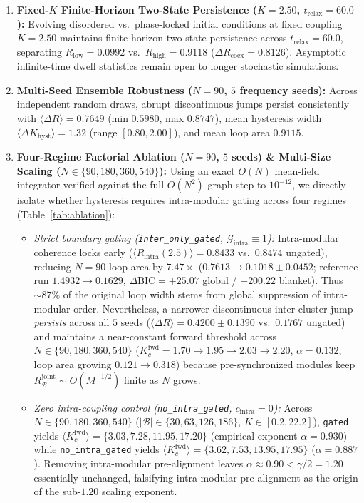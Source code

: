 \documentclass[11pt,a4paper]{article}
\begin{document}
\begin{enumerate}
\item \textbf{Fixed-$K$ Finite-Horizon Two-State Persistence ($K = 2.50$, $t_{\mathrm{relax}} = 60.0$):} Evolving disordered vs.\ phase-locked initial conditions at fixed coupling $K = 2.50$ maintains finite-horizon two-state persistence across $t_{\mathrm{relax}} = 60.0$, separating $R_{\mathrm{low}} = 0.0992$ vs.\ $R_{\mathrm{high}} = 0.9118$ ($\Delta R_{\mathrm{coex}} = 0.8126$). Asymptotic infinite-time dwell statistics remain open to longer stochastic simulations.
\item \textbf{Multi-Seed Ensemble Robustness ($N=90$, $5$ frequency seeds):} Across independent random draws, abrupt discontinuous jumps persist consistently with $\langle\Delta R\rangle = 0.7649$ (min $0.5980$, max $0.8747$), mean hysteresis width $\langle\Delta K_{\mathrm{hyst}}\rangle = 1.32$ (range $[0.80, 2.00]$), and mean loop area $0.9115$.
\item \textbf{Four-Regime Factorial Ablation ($N=90$, $5$ seeds) \& Multi-Size Scaling ($N \in \{90, 180, 360, 540\}$):} Using an exact $O(N)$ mean-field integrator verified against the full $O(N^2)$ graph step to $10^{-12}$, we directly isolate whether hysteresis requires intra-modular gating across four regimes (Table~\ref{tab:ablation}):
  \begin{itemize}
  \item \emph{Strict boundary gating (\texttt{inter\_only\_gated}, $\mathcal{G}_{\mathrm{intra}} \equiv 1$):} Intra-modular coherence locks early ($\langle R_{\mathrm{intra}}(2.5)\rangle = 0.8433$ vs.\ $0.8474$ ungated), reducing $N=90$ loop area by $7.47\times$ ($0.7613 \to 0.1018 \pm 0.0452$; reference run $1.4932 \to 0.1629$, $\Delta\mathrm{BIC} = +25.07$ global / $+200.22$ blanket). Thus $\sim 87\%$ of the original loop width stems from global suppression of intra-modular order. Nevertheless, a narrower discontinuous inter-cluster jump \emph{persists} across all $5$ seeds ($\langle\Delta R\rangle = 0.4200 \pm 0.1390$ vs.\ $0.1767$ ungated) and maintains a near-constant forward threshold across $N \in \{90, 180, 360, 540\}$ ($K_c^{\mathrm{fwd}} = 1.70 \to 1.95 \to 2.03 \to 2.20$, $\alpha = 0.132$, loop area growing $0.121 \to 0.318$) because pre-synchronized modules keep $R_{\mathcal{B}}^{\mathrm{joint}} \sim O(M^{-1/2})$ finite as $N$ grows.
  \item \emph{Zero intra-coupling control (\texttt{no\_intra\_gated}, $c_{\mathrm{intra}} = 0$):} Across $N \in \{90, 180, 360, 540\}$ ($|\mathcal{B}| \in \{30, 63, 126, 186\}$, $K \in [0.2, 22.2]$), \texttt{gated} yields $\langle K_c^{\mathrm{fwd}}\rangle = \{3.03, 7.28, 11.95, 17.20\}$ (empirical exponent $\alpha = 0.930$) while \texttt{no\_intra\_gated} yields $\langle K_c^{\mathrm{fwd}}\rangle = \{3.62, 7.53, 13.95, 17.95\}$ ($\alpha = 0.887$). Removing intra-modular pre-alignment leaves $\alpha \approx 0.90 < \gamma/2 = 1.20$ essentially unchanged, falsifying intra-modular pre-alignment as the origin of the sub-$1.20$ scaling exponent.
  \end{itemize}
\end{enumerate}
\end{document}
